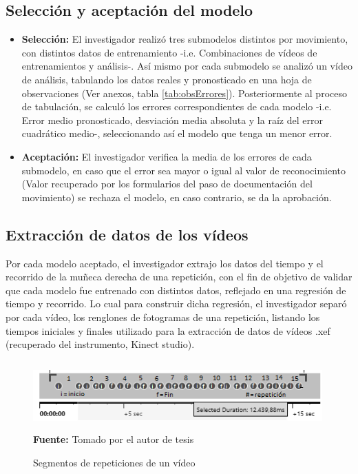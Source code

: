 \subsection{Selecci\'on y aceptaci\'on del modelo}
\begin{itemize}
\item \textbf{Selecci\'on:} El investigador realiz\'o tres submodelos distintos por movimiento, con distintos datos de entrenamiento -i.e. Combinaciones de v\'ideos de entrenamientos y an\'alisis-. As\'i mismo por cada submodelo se analiz\'o un v\'ideo de an\'alisis, tabulando los datos reales y pronosticado en una hoja de observaciones (Ver anexos, tabla \ref{tab:obsErrores}). Posteriormente al proceso de tabulaci\'on, se calcul\'o los errores correspondientes de cada modelo -i.e. Error medio pronosticado, desviaci\'on media absoluta y la ra\'iz del error cuadr\'atico medio-, seleccionando as\'i el modelo que tenga un menor error. 
\item \textbf{Aceptaci\'on:} El investigador  verifica la media de los errores de cada submodelo, en caso que el error sea mayor o igual  al valor de reconocimiento (Valor recuperado por los formularios del paso de documentaci\'on del movimiento) se rechaza el modelo, en caso contrario, se da la aprobaci\'on.
\end{itemize}
\subsection{Extracci\'on de datos de los v\'ideos}
Por cada modelo aceptado, el investigador extrajo los datos del tiempo y el recorrido de la mu\~neca derecha de una repetici\'on, con el fin de objetivo de validar que cada modelo fue entrenado con distintos datos, reflejado en una  regresi\'on de tiempo y recorrido. Lo cual para construir dicha regresi\'on, el investigador separ\'o por cada v\'ideo, los renglones de fotogramas de una repetici\'on, listando los tiempos iniciales y finales utilizado para la extracci\'on de datos de v\'ideos .xef (recuperado del instrumento, Kinect studio).
\begin{figure}[H]
	\caption{Segmentos de repeticiones de un v\'ideo}
	\label{fig:segVideo}
	\centering
	\includegraphics[width=420px,height=100px]{graphics/separarPuntos.PNG} \\
	\textbf{Fuente:} Tomado por el autor de tesis
\end{figure} 
